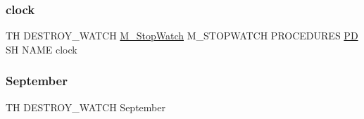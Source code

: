 \subsubsection{\texorpdfstring{clock}{clock}}
{\footnotesize\ttfamily TH D\+E\+S\+T\+R\+O\+Y\+\_\+\+W\+A\+T\+CH \hyperlink{option__stopwatch_83_8txt_aa2011fc45a5e502e87ee50996a8a9305}{M\+\_\+\+Stop\+Watch} M\+\_\+\+S\+T\+O\+P\+W\+A\+T\+CH P\+R\+O\+C\+E\+D\+U\+R\+ES \hyperlink{what__overview_81_8txt_a85f26da5a4481fbdb0d9c79f2b94de3e}{PD} SH N\+A\+ME clock}

\mbox{\label{destroy__watch_83_8txt_acabdf4ce798cad6afe1d3f1796bf4814}} 
\subsubsection{\texorpdfstring{September}{September}}
{\footnotesize\ttfamily TH D\+E\+S\+T\+R\+O\+Y\+\_\+\+W\+A\+T\+CH September}

